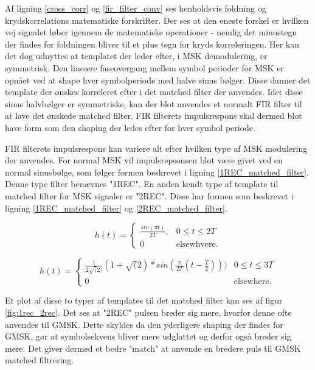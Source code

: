 \begin{appendices}
Af ligning \ref{cross_corr} og \ref{fir_filter_conv} ses henholdsvis foldning og krydskorrelations matematiske forskrifter. Der ses at den eneste forskel er hvilken vej signalet løber igennem de matematiske operationer - nemlig det minustegn der findes for foldningen bliver til et plus tegn for kryds korreleringen. Her kan det dog udnyttes at templatet der leder efter, i MSK demodulering, er symmetrisk. Den lineære faseovergang mellem symbol perioder for MSK er opnået ved at shape hver symbolperiode med halve sinus bølger. Disse danner det template der ønskes korreleret efter i det matched filter der anvendes. Idet disse sinus halvbølger er symmetriske, kan der blot anvendes et normalt FIR filter til at lave det ønskede matched filter. FIR filterets impulsrespons skal dermed blot have form som den shaping der ledes efter for hver symbol periode. 

FIR filterets impulsrespons kan variere alt efter hvilken type af MSK modulering der anvendes. For normal MSK vil impulsrepsonsen blot være givet ved en normal sinusbølge, som følger formen beskrevet i ligning \ref{1REC_matched_filter}. Denne type filter benævnes "1REC". En anden kendt type af template til matched filter for MSK signaler er "2REC". Disse har formen som beskrevet i ligning \ref{1REC_matched_filter} og \ref{2REC_matched_filter}.

\begin{equation} \label{1REC_matched_filter}
h(t) = \begin{cases}
    \frac{sin(\pi t)}{2T}, & 0 \leq t \leq 2T\\
    0 & \text{elsewhvere}.
\end{cases}\end{equation}

\begin{equation} \label{2REC_matched_filter}
h(t) = \begin{cases}
    \frac{1}{2 \sqrt(2)}(1 + \sqrt(2) * sin(\frac{\pi}{2T}(t - \frac{T}{2}))) & 0 \leq t \leq 3T\\
    0 & \text{elsewhere}.
\end{cases}\end{equation}

Et plot af disse to typer af templates til det matched filter kan ses af figur \ref{fig:1rec_2rec}. Det ses at "2REC" pulsen breder sig mere, hvorfor denne ofte anvendes til GMSK. Dette skyldes da den yderligere shaping der findes for GMSK, gør at symbolsekvens bliver mere udglattet og derfor også breder sig mere. Det giver dermed et bedre "match" at anvende en bredere puls til GMSK matched filtrering.


\end{appendices}
